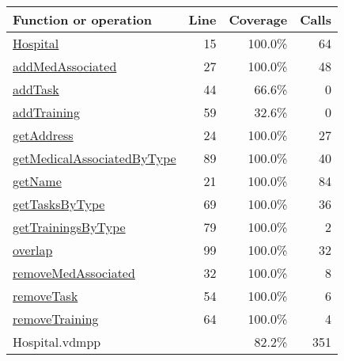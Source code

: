\bigskip
\begin{longtable}{|l|r|r|r|}
\hline
Function or operation & Line & Coverage & Calls \\
\hline
\hline
\hyperref[Hospital:15]{Hospital} & 15&100.0\% & 64 \\
\hline
\hyperref[addMedAssociated:27]{addMedAssociated} & 27&100.0\% & 48 \\
\hline
\hyperref[addTask:44]{addTask} & 44&66.6\% & 0 \\
\hline
\hyperref[addTraining:59]{addTraining} & 59&32.6\% & 0 \\
\hline
\hyperref[getAddress:24]{getAddress} & 24&100.0\% & 27 \\
\hline
\hyperref[getMedicalAssociatedByType:89]{getMedicalAssociatedByType} & 89&100.0\% & 40 \\
\hline
\hyperref[getName:21]{getName} & 21&100.0\% & 84 \\
\hline
\hyperref[getTasksByType:69]{getTasksByType} & 69&100.0\% & 36 \\
\hline
\hyperref[getTrainingsByType:79]{getTrainingsByType} & 79&100.0\% & 2 \\
\hline
\hyperref[overlap:99]{overlap} & 99&100.0\% & 32 \\
\hline
\hyperref[removeMedAssociated:32]{removeMedAssociated} & 32&100.0\% & 8 \\
\hline
\hyperref[removeTask:54]{removeTask} & 54&100.0\% & 6 \\
\hline
\hyperref[removeTraining:64]{removeTraining} & 64&100.0\% & 4 \\
\hline
\hline
Hospital.vdmpp & & 82.2\% & 351 \\
\hline
\end{longtable}

